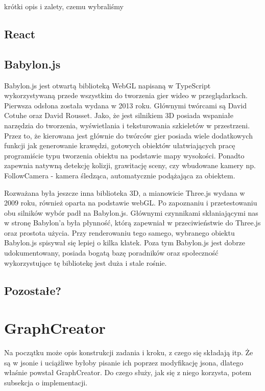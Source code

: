 \documentclass[11pt,a4paper,polish,thesis]{dcsbook}
\begin{document}
	krótki opis i zalety, czemu wybraliśmy
	
	\subsection{React}
	

	
	\subsection{Babylon.js}

	Babylon.js jest otwartą biblioteką WebGL napisaną w TypeScript wykorzystywaną przede wszystkim do tworzenia gier wideo w przeglądarkach. Pierwsza odsłona została wydana w 2013 roku. Głównymi twórcami są David Cotuhe oraz David Rousset. Jako, że jest silnikiem 3D posiada wspaniałe narzędzia do tworzenia, wyświetlania i teksturowania szkieletów w przestrzeni. Przez to, że kierowana jest głównie do twórców gier posiada wiele dodatkowych funkcji jak generowanie krawędzi, gotowych obiektów ułatwiających pracę programiście typu tworzenia obiektu na podstawie mapy wysokości. Ponadto zapewnia natywną detekcję kolizji, grawitację sceny, czy wbudowane kamery np. FollowCamera - kamera śledząca, automatycznie podążająca za obiektem. 
	
	Rozważana była jeszcze inna biblioteka 3D, a mianowicie Three.js wydana w 2009 roku, również oparta na podstawie webGL. Po zapoznaniu i przetestowaniu obu silników wybór padł na Babylon.js. Głównymi czynnikami skłaniającymi nas w stronę Babylon'a była płynność, którą zapewniał w przeciwieństwie do Three.js oraz prostota użycia. Przy renderowaniu tego samego, wybranego obiektu Babylon.js spisywał się lepiej o kilka klatek. Poza tym Babylon.js jest dobrze udokumentowany, posiada bogatą bazę poradników oraz społeczność wykorzystujące tę bibliotekę jest duża i stale rośnie.
	
	\subsection{Pozostałe?}
	
	\section{GraphCreator}
	Na początku może opis konstrukcji zadania i kroku, z czego się składają itp. 
	Że są w jsonie i uciążliwe byłoby pisanie ich poprzez modyfikację jsona, dlatego właśnie powstał GraphCreator.
	Do czego służy, jak się z niego korzysta, potem subsekcja o implementacji.
	
\end{document}
